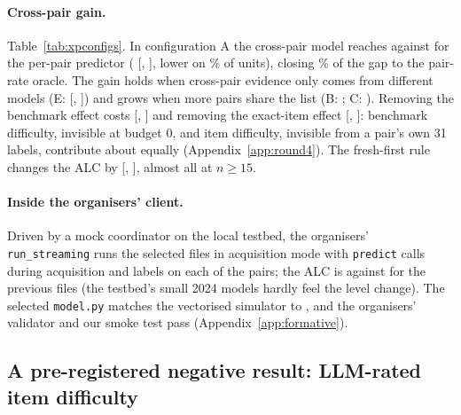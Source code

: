 \documentclass{article}
\begin{document}
\paragraph{Cross-pair gain.} Table~\ref{tab:xpconfigs}. In configuration A the cross-pair model reaches \XpCAXpAlc{} against \XpCASZeroAlc{} for the per-pair predictor (\XpCADiffSZeroMean{} [\XpCADiffSZeroLo, \XpCADiffSZeroHi], lower on \XpCADiffSZeroFracNeg\% of units), closing \XpCAGapClosed\% of the gap to the pair-rate oracle. The gain holds when cross-pair evidence only comes from different models (E: \XpCEDiffSZeroMean{} [\XpCEDiffSZeroLo, \XpCEDiffSZeroHi]) and grows when more pairs share the list (B: \XpCBDiffSZeroMean; C: \XpCCDiffSZeroMean). Removing the benchmark effect costs \XpCompABenchMean{} [\XpCompABenchLo, \XpCompABenchHi] and removing the exact-item effect \XpCompAItemMean{} [\XpCompAItemLo, \XpCompAItemHi]: benchmark difficulty, invisible at budget 0, and item difficulty, invisible from a pair's own 31 labels, contribute about equally (Appendix~\ref{app:round4}). The fresh-first rule changes the ALC by \XpAcqMean{} [\XpAcqLo, \XpAcqHi], almost all at $n\ge15$.

\paragraph{Inside the organisers' client.} Driven by a mock coordinator on the local testbed, the organisers' \texttt{run\_streaming} runs the selected files in \texttt{\CkSelLoopMode} acquisition mode with \CkSelLoopAcqPredCalls{} \texttt{predict} calls during acquisition and \CkSelLoopLabels{} labels on each of the \CkSelLoopNPairs{} pairs; the ALC is \CkSelLoopAlc{} against \CkShipLoopAlc{} for the previous files (the testbed's small 2024 models hardly feel the level change). The selected \texttt{model.py} matches the vectorised simulator to \CkSelEquivMaxDiff, and the organisers' validator and our smoke test pass (Appendix~\ref{app:formative}).

\subsection{A pre-registered negative result: LLM-rated item difficulty}
\label{sec:items}
\end{document}
